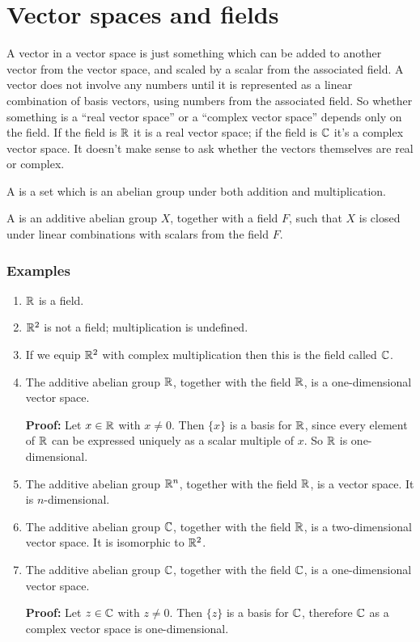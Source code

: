 \section{Vector spaces and fields}\label{real-and-complex-vector-spaces}
A vector in a vector space is just something which can be added to another vector from the vector
space, and scaled by a scalar from the associated field. A vector does not involve any numbers until
it is represented as a linear combination of basis vectors, using numbers from the associated
field. So whether something is a ``real vector space​'' or a ``complex vector space​'' depends only on
the field. If the field is $\mathbb{R}$ it is a real vector space; if the field is $\mathbb{C}$ it's a complex
vector space. It doesn't make sense to ask whether the vectors themselves are real or complex.

A  is a set which is an abelian group under both addition and multiplication.

A  is an additive abelian group $X$, together with a field $F$, such that $X$ is
closed under linear combinations with scalars from the field $F$.

\subsubsection{Examples}

\begin{enumerate}
\item $\mathbb{R}$ is a field.

\item $\mathbb{R}^2$ is not a field; multiplication is undefined.

\item If we equip $\mathbb{R}^2$ with complex multiplication then this is the field called $\mathbb{C}$.

\item The additive abelian group $\mathbb{R}$, together with the field $\mathbb{R}$, is a one-dimensional vector space.

  {\bf Proof:} Let $x \in \mathbb{R}$ with $x \neq 0$. Then $\{x\}$ is a basis for $\mathbb{R}$, since every element of $\mathbb{R}$ can
  be expressed uniquely as a scalar multiple of $x$. So $\mathbb{R}$ is one-dimensional.

\item The additive abelian group $\mathbb{R}^n$, together with the field $\mathbb{R}$, is a vector space. It is $n$-dimensional.

\item The additive abelian group $\mathbb{C}$, together with the field $\mathbb{R}$, is a two-dimensional vector
  space. It is isomorphic to $\mathbb{R}^2$.

\item The additive abelian group $\mathbb{C}$, together with the field $\mathbb{C}$, is a one-dimensional vector space.

  {\bf Proof:} Let $z \in \mathbb{C}$ with $z \neq 0$. Then $\{z\}$ is a basis for $\mathbb{C}$, therefore $\mathbb{C}$ as a
  complex vector space is one-dimensional.
\end{enumerate}

